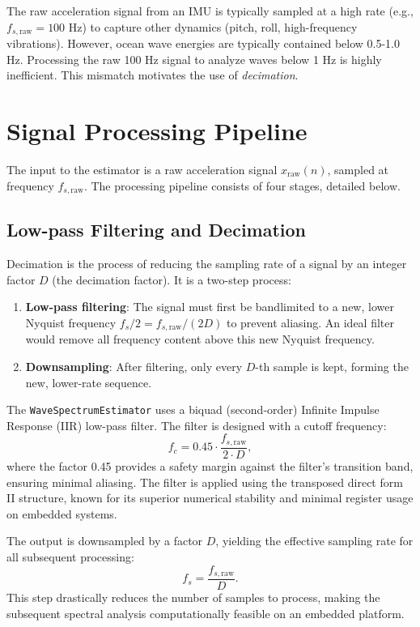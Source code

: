 \documentclass[11pt,letterpaper]{article}
\begin{document}
    The raw acceleration signal from an IMU is typically sampled at a high rate (e.g., $f_{s,\text{raw}} = 100$ Hz) to capture other dynamics (pitch, roll, high-frequency vibrations). However, ocean wave energies are typically contained below 0.5-1.0 Hz. Processing the raw 100 Hz signal to analyze waves below 1 Hz is highly inefficient. This mismatch motivates the use of \textit{decimation}.

    \section{Signal Processing Pipeline}
    \label{sec:pipeline}
    The input to the estimator is a raw acceleration signal $x_{\text{raw}}(n)$, sampled at frequency $f_{s,\text{raw}}$. The processing pipeline consists of four stages, detailed below.

    \subsection{Low-pass Filtering and Decimation}
    \label{subsec:decimation}
    Decimation is the process of reducing the sampling rate of a signal by an integer factor $D$ (the decimation factor). It is a two-step process:
    \begin{enumerate}
        \item \textbf{Low-pass filtering}: The signal must first be bandlimited to a new, lower Nyquist frequency $f_s/2 = f_{s,\text{raw}}/(2D)$ to prevent aliasing. An ideal filter would remove all frequency content above this new Nyquist frequency.
        \item \textbf{Downsampling}: After filtering, only every $D$-th sample is kept, forming the new, lower-rate sequence.
    \end{enumerate}

    The \texttt{WaveSpectrumEstimator} uses a biquad (second-order) Infinite Impulse Response (IIR) low-pass filter. The filter is designed with a cutoff frequency:
    \begin{equation}
        f_c = 0.45 \cdot \frac{f_{s,\text{raw}}}{2 \cdot D},
    \end{equation}
    where the factor 0.45 provides a safety margin against the filter's transition band, ensuring minimal aliasing. The filter is applied using the transposed direct form II structure, known for its superior numerical stability and minimal register usage on embedded systems.

    The output is downsampled by a factor $D$, yielding the effective sampling rate for all subsequent processing:
    \begin{equation}
        f_s = \frac{f_{s,\text{raw}}}{D}.
    \end{equation}
    This step drastically reduces the number of samples to process, making the subsequent spectral analysis computationally feasible on an embedded platform.
\end{document}
